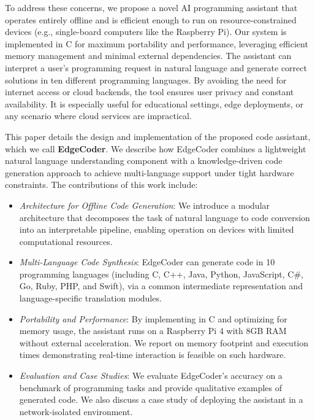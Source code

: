 \documentclass[12pt]{article}
\begin{document}
To address these concerns, we propose a novel AI programming assistant that operates entirely offline and is efficient enough to run on resource-constrained devices (e.g., single-board computers like the Raspberry Pi). Our system is implemented in C for maximum portability and performance, leveraging efficient memory management and minimal external dependencies. The assistant can interpret a user's programming request in natural language and generate correct solutions in ten different programming languages. By avoiding the need for internet access or cloud backends, the tool ensures user privacy and constant availability. It is especially useful for educational settings, edge deployments, or any scenario where cloud services are impractical.

This paper details the design and implementation of the proposed code assistant, which we call \textbf{EdgeCoder}. We describe how EdgeCoder combines a lightweight natural language understanding component with a knowledge-driven code generation approach to achieve multi-language support under tight hardware constraints. The contributions of this work include:
\begin{itemize}
    \item \textit{Architecture for Offline Code Generation}: We introduce a modular architecture that decomposes the task of natural language to code conversion into an interpretable pipeline, enabling operation on devices with limited computational resources.
    \item \textit{Multi-Language Code Synthesis}: EdgeCoder can generate code in 10 programming languages (including C, C++, Java, Python, JavaScript, C\#, Go, Ruby, PHP, and Swift), via a common intermediate representation and language-specific translation modules.
    \item \textit{Portability and Performance}: By implementing in C and optimizing for memory usage, the assistant runs on a Raspberry Pi 4 with 8GB RAM without external acceleration. We report on memory footprint and execution times demonstrating real-time interaction is feasible on such hardware.
    \item \textit{Evaluation and Case Studies}: We evaluate EdgeCoder’s accuracy on a benchmark of programming tasks and provide qualitative examples of generated code. We also discuss a case study of deploying the assistant in a network-isolated environment.
\end{itemize}
\end{document}
